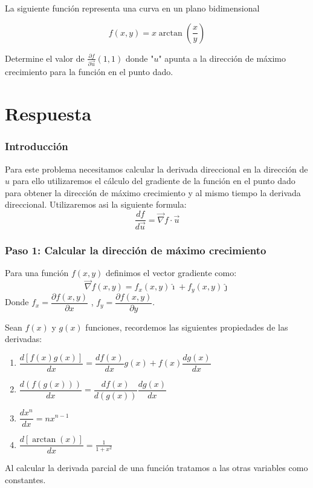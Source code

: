 \item La siguiente función representa una curva en un plano bidimensional
        \begin{LARGE}
            \begin{equation*}
                f(x,y) = x \arctan(\frac{x}{y})
            \end{equation*}
        \end{LARGE}
        Determine el valor de $ \frac{\partial f}{\partial \vec{u}}(1, 1) $ donde "$u$" apunta a la dirección de máximo crecimiento para la
        función en el punto dado.
\section*{Respuesta}
    \subsubsection*{Introducción}
        Para este problema necesitamos calcular la derivada direccional en la dirección de $u$ para ello utilizaremos el cálculo del gradiente
        de la función en el punto dado para obtener la dirección de máximo crecimiento y al mismo tiempo la derivada direccional.
        Utilizaremos asi la siguiente formula:
        \begin{equation}
            \dfrac{d f}{d \vec{u}} = \vec{\nabla}f \cdot \vec{u}
            \label{eq:form2}
        \end{equation}
    \subsubsection*{Paso 1: Calcular la dirección de máximo crecimiento}
        Para una función $f(x,y)$ definimos el vector gradiente como:
        \begin{equation*}
            \vec{\nabla}f(x, y) = f_x(x, y)\hat{\imath} + f_y(x, y)\hat{\jmath}
        \end{equation*}
        Donde $f_x = \dfrac{\partial f(x, y)}{\partial x}$ , $f_y = \dfrac{\partial f(x, y)}{\partial y} $.
        
        Sean $f(x)$ y $g(x)$ funciones, recordemos las siguientes propiedades de las derivadas:
        \begin{enumerate}
            \item $\dfrac{d [f(x)g(x)]}{dx} = \dfrac{d f(x)}{dx}g(x) + f(x)\dfrac{d g(x)}{dx}$
            \item $\dfrac{d(f(g(x)))}{dx} = \dfrac{d f(x)}{d(g(x))}\dfrac{d g(x)}{dx} $
            \item $\dfrac{d x^n}{dx} = nx^{n-1}$
            \item $\dfrac{d[\arctan(x)]}{dx} = \frac{1}{1 + x^2} $
        \end{enumerate}
        Al calcular la derivada parcial de una función tratamos a las otras variables como constantes.

